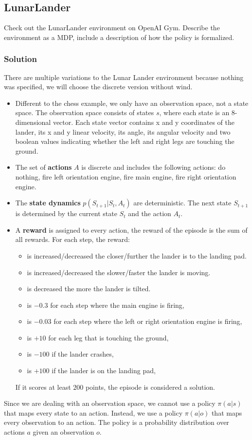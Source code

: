 \documentclass{article}
\begin{document}
\subsection{LunarLander}
Check out the LunarLander environment on OpenAI Gym. Describe the environment as a MDP, 
include a description of how the policy is
formalized.
\subsubsection{Solution}
There are multiple variations to the Lunar Lander environment \textemdash{} because nothing was 
specified, we will choose the discrete version without wind.
\begin{itemize}
    \item Different to the chess example, we only have an observation space, not a state space. The observation
    space consists of states $s$, where each state is an 8-dimensional vector. Each state vector contains
    x and y coordinates of the lander, its x and y linear velocity, its angle, its angular velocity and 
    two boolean values indicating whether the left and right legs are touching the ground.
    \item The set of \textbf{actions} $A$ is discrete and includes the following actions: do nothing, fire left orientation engine,
    fire main engine, fire right orientation engine.
    \item The \textbf{state dynamics} $p(S_{t+1} | S_t, A_t)$ are deterministic. The next state $S_{t+1}$ is
    determined by the current state $S_t$ and the action $A_t$.
    \item A \textbf{reward} is assigned to every action, the reward of the episode is the 
    sum of all rewards. For each step, the reward:
    \begin{itemize}
        \item is increased/decreased the closer/further the lander is to the landing pad.
        \item is increased/decreased the slower/faster the lander is moving.
        \item is decreased the more the lander is tilted.
        \item is $-0.3$ for each step where the main engine is firing,
        \item is $-0.03$ for each step where the left or right orientation engine is firing,
        \item is $+10$ for each leg that is touching the ground,
        \item is $-100$ if the lander crashes,
        \item is $+100$ if the lander is on the landing pad,
    \end{itemize}
    If it scores at least $200$ points, the episode is considered a solution.
\end{itemize}
Since we are dealing with an observation space, we cannot use a policy $\pi(a|s)$ that maps every state
to an action. Instead, we use a policy $\pi(a|o)$ that maps every observation to an action. The policy
is a probability distribution over actions $a$ given an observation $o$.
\end{document}
